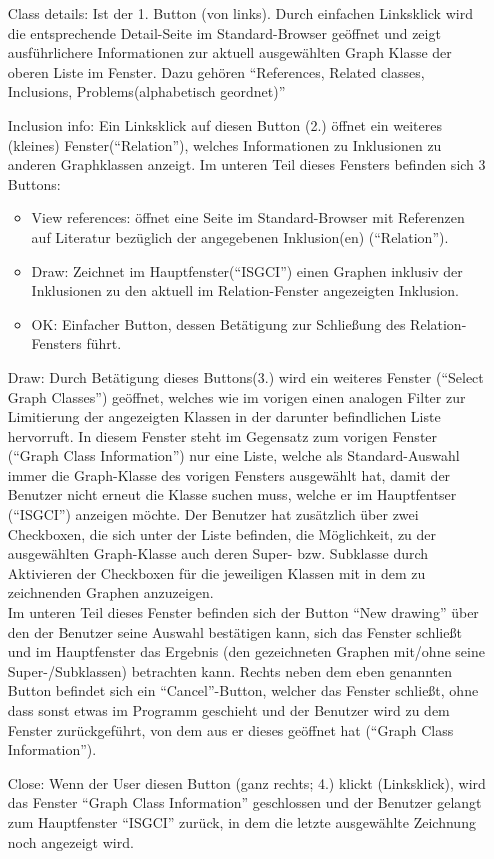 \documentclass[10pt,a4paper]{article}
\begin{document}
\begin{itemize}
\item[Class details:] Ist der 1. Button (von links). Durch einfachen Linksklick wird die entsprechende Detail-Seite im Standard-Browser geöffnet und zeigt ausführlichere Informationen zur aktuell ausgewählten Graph Klasse der oberen Liste im Fenster. Dazu gehören "`References, Related classes, Inclusions, Problems(alphabetisch geordnet)"'
\item[Inclusion info:] Ein Linksklick auf diesen Button (2.) öffnet ein weiteres (kleines) Fenster("`Relation"'), welches Informationen zu Inklusionen zu anderen Graphklassen anzeigt. Im unteren Teil dieses Fensters befinden sich 3 Buttons:
\begin{itemize}
\item View references: öffnet eine Seite im Standard-Browser mit Referenzen auf Literatur bezüglich der angegebenen Inklusion(en) ("`Relation"').
\item Draw: Zeichnet im Hauptfenster("`ISGCI"') einen Graphen inklusiv der Inklusionen zu den aktuell im Relation-Fenster angezeigten Inklusion.
\item OK: Einfacher Button, dessen Betätigung zur Schließung des Relation-Fensters führt.
\end{itemize}
\item[Draw:] Durch Betätigung dieses Buttons(3.) wird ein weiteres Fenster ("`Select Graph Classes"') geöffnet, welches wie im vorigen einen analogen Filter zur Limitierung der angezeigten Klassen in der darunter befindlichen Liste hervorruft. In diesem Fenster steht im Gegensatz zum vorigen Fenster ("`Graph Class Information"') nur eine Liste, welche als Standard-Auswahl immer die Graph-Klasse des vorigen Fensters ausgewählt hat, damit der Benutzer nicht erneut die Klasse suchen muss, welche er im Hauptfentser ("`ISGCI"') anzeigen möchte. Der Benutzer hat zusätzlich über zwei Checkboxen, die sich unter der Liste befinden, die Möglichkeit, zu der ausgewählten Graph-Klasse auch deren Super- bzw. Subklasse durch Aktivieren der Checkboxen für die jeweiligen Klassen mit in dem zu zeichnenden Graphen anzuzeigen. \\ Im unteren Teil dieses Fenster befinden sich der Button "`New drawing"' über den der Benutzer seine Auswahl bestätigen kann, sich das Fenster schließt und im Hauptfenster das Ergebnis (den gezeichneten Graphen mit/ohne seine Super-/Subklassen) betrachten kann. Rechts neben dem eben genannten Button befindet sich ein "`Cancel"'-Button, welcher das Fenster schließt, ohne dass sonst etwas im Programm geschieht und der Benutzer wird zu dem Fenster zurückgeführt, von dem aus er dieses geöffnet hat ("`Graph Class Information"').
\item[Close:] Wenn der User diesen Button (ganz rechts; 4.) klickt (Linksklick), wird das Fenster "`Graph Class Information"' geschlossen und der Benutzer gelangt zum Hauptfenster "`ISGCI"' zurück, in dem die letzte ausgewählte Zeichnung noch angezeigt wird.
\end{itemize}
\end{document}
